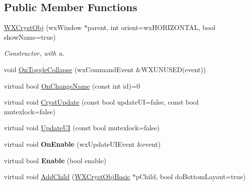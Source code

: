 \subsection*{Public Member Functions}
\begin{DoxyCompactItemize}
\item 
\mbox{\label{class_obj_cryst_1_1_w_x_cryst_obj_aee6a4d5c3a1dfa315e5520f56621c153}} 
\mbox{\hyperlink{class_obj_cryst_1_1_w_x_cryst_obj_aee6a4d5c3a1dfa315e5520f56621c153}{W\+X\+Cryst\+Obj}} (wx\+Window $\ast$parent, int orient=wx\+H\+O\+R\+I\+Z\+O\+N\+T\+AL, bool show\+Name=true)
\begin{DoxyCompactList}\small\item\em Constructor, with a. \end{DoxyCompactList}\item 
void \mbox{\hyperlink{class_obj_cryst_1_1_w_x_cryst_obj_ae55c3091101cae5d79e5aacb77c48856}{On\+Toggle\+Collapse}} (wx\+Command\+Event \&W\+X\+U\+N\+U\+S\+ED(event))
\item 
virtual bool \mbox{\hyperlink{class_obj_cryst_1_1_w_x_cryst_obj_a3736357599263df7e550790753c040a3}{On\+Change\+Name}} (const int id)=0
\item 
virtual void \mbox{\hyperlink{class_obj_cryst_1_1_w_x_cryst_obj_a1ea28fa0a66b5163b66bf42a8d1451b3}{Cryst\+Update}} (const bool update\+UI=false, const bool mutexlock=false)
\item 
virtual void \mbox{\hyperlink{class_obj_cryst_1_1_w_x_cryst_obj_a6578681b14426e8a844ac6e4ca7fafea}{Update\+UI}} (const bool mutexlock=false)
\item 
\mbox{\label{class_obj_cryst_1_1_w_x_cryst_obj_af5ba1ca8c4e1bd498bfb273fbb543ee6}} 
virtual void {\bfseries On\+Enable} (wx\+Update\+U\+I\+Event \&event)
\item 
\mbox{\label{class_obj_cryst_1_1_w_x_cryst_obj_a0098f5157b4874b96aaede1889237aab}} 
virtual bool {\bfseries Enable} (bool enable)
\item 
virtual void \mbox{\hyperlink{class_obj_cryst_1_1_w_x_cryst_obj_a2d79799836e2138925a55b66601bbfe3}{Add\+Child}} (\mbox{\hyperlink{class_obj_cryst_1_1_w_x_cryst_obj_basic}{W\+X\+Cryst\+Obj\+Basic}} $\ast$p\+Child, bool do\+Bottom\+Layout=true)
\end{DoxyCompactItemize}
